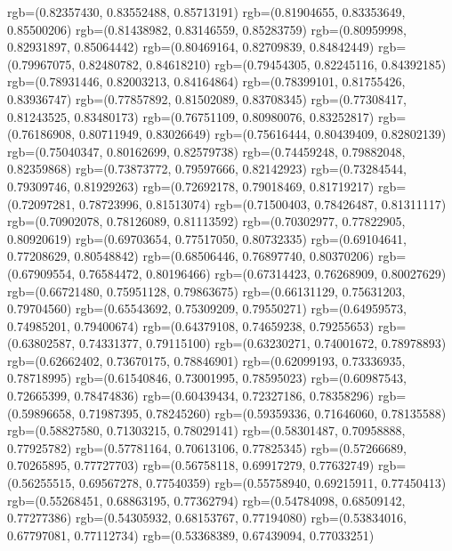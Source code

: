 {{        rgb=(0.82357430, 0.83552488, 0.85713191)
        rgb=(0.81904655, 0.83353649, 0.85500206)
        rgb=(0.81438982, 0.83146559, 0.85283759)
        rgb=(0.80959998, 0.82931897, 0.85064442)
        rgb=(0.80469164, 0.82709839, 0.84842449)
        rgb=(0.79967075, 0.82480782, 0.84618210)
        rgb=(0.79454305, 0.82245116, 0.84392185)
        rgb=(0.78931446, 0.82003213, 0.84164864)
        rgb=(0.78399101, 0.81755426, 0.83936747)
        rgb=(0.77857892, 0.81502089, 0.83708345)
        rgb=(0.77308417, 0.81243525, 0.83480173)
        rgb=(0.76751109, 0.80980076, 0.83252817)
        rgb=(0.76186908, 0.80711949, 0.83026649)
        rgb=(0.75616444, 0.80439409, 0.82802139)
        rgb=(0.75040347, 0.80162699, 0.82579738)
        rgb=(0.74459248, 0.79882048, 0.82359868)
        rgb=(0.73873772, 0.79597666, 0.82142923)
        rgb=(0.73284544, 0.79309746, 0.81929263)
        rgb=(0.72692178, 0.79018469, 0.81719217)
        rgb=(0.72097281, 0.78723996, 0.81513074)
        rgb=(0.71500403, 0.78426487, 0.81311117)
        rgb=(0.70902078, 0.78126089, 0.81113592)
        rgb=(0.70302977, 0.77822905, 0.80920619)
        rgb=(0.69703654, 0.77517050, 0.80732335)
        rgb=(0.69104641, 0.77208629, 0.80548842)
        rgb=(0.68506446, 0.76897740, 0.80370206)
        rgb=(0.67909554, 0.76584472, 0.80196466)
        rgb=(0.67314423, 0.76268909, 0.80027629)
        rgb=(0.66721480, 0.75951128, 0.79863675)
        rgb=(0.66131129, 0.75631203, 0.79704560)
        rgb=(0.65543692, 0.75309209, 0.79550271)
        rgb=(0.64959573, 0.74985201, 0.79400674)
        rgb=(0.64379108, 0.74659238, 0.79255653)
        rgb=(0.63802587, 0.74331377, 0.79115100)
        rgb=(0.63230271, 0.74001672, 0.78978893)
        rgb=(0.62662402, 0.73670175, 0.78846901)
        rgb=(0.62099193, 0.73336935, 0.78718995)
        rgb=(0.61540846, 0.73001995, 0.78595023)
        rgb=(0.60987543, 0.72665399, 0.78474836)
        rgb=(0.60439434, 0.72327186, 0.78358296)
        rgb=(0.59896658, 0.71987395, 0.78245260)
        rgb=(0.59359336, 0.71646060, 0.78135588)
        rgb=(0.58827580, 0.71303215, 0.78029141)
        rgb=(0.58301487, 0.70958888, 0.77925782)
        rgb=(0.57781164, 0.70613106, 0.77825345)
        rgb=(0.57266689, 0.70265895, 0.77727703)
        rgb=(0.56758118, 0.69917279, 0.77632749)
        rgb=(0.56255515, 0.69567278, 0.77540359)
        rgb=(0.55758940, 0.69215911, 0.77450413)
        rgb=(0.55268451, 0.68863195, 0.77362794)
        rgb=(0.54784098, 0.68509142, 0.77277386)
        rgb=(0.54305932, 0.68153767, 0.77194080)
        rgb=(0.53834016, 0.67797081, 0.77112734)
        rgb=(0.53368389, 0.67439094, 0.77033251)
}}
